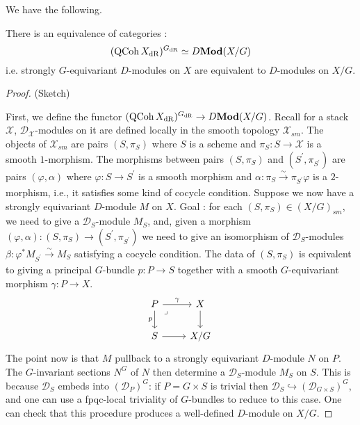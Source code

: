 \documentclass{article}
\begin{document}
We have the following.
\begin{prop}
  
  There is an equivalence of categories : 
  \[
    (\operatorname{QCoh} X_{\mathrm{dR}})^{G_{\mathrm{dR}}} \simeq D\mathbf{Mod}(X / G)
  \]
  i.e. strongly $G$-equivariant $D$-modules on $X$
  are equivalent to $D$-modules on $X / G$.
\end{prop}
\begin{proof}(Sketch)
  
  First, we define the functor $(\operatorname{QCoh} X_{\mathrm{dR}})^{G_{\mathrm{dR}}} \to D\mathbf{Mod}(X / G)$.
  Recall for a stack $\mathscr{X}$, 
  $\mathcal{D}_{\mathscr{X}}$-modules on it are defined locally 
  in the smooth topology $\mathscr{X}_{sm}$.
  The objects of $\mathscr{X}_{sm}$ are pairs $(S,\pi_S)$ 
  where $S$ is a scheme and 
  $\pi_S : S \to \mathscr{X}$ is a smooth $1$-morphism. 
  \cite[Section 1.1.2]{BD}
  The morphisms between pairs $(S,\pi_S)$ and 
  $(S^\prime, \pi_{S^\prime})$ are pairs $(\varphi,\alpha)$ 
  where $\varphi: S \to S^\prime$ is a smooth morphism 
  and $\alpha: \pi_S \xrightarrow[]{\sim} \pi_{S^\prime} \varphi$ is 
  a $2$-morphism, i.e., it satisfies some kind of cocycle condition. 
  Suppose we now have a strongly equivariant $D$-module $M$ on $X$.
  Goal : for each $(S,\pi_S) \in (X / G)_{sm}$, 
  we need to give a $\mathcal{D}_S$-module $M_S$, 
  and, given a morphism 
  $(\varphi, \alpha):(S,\pi_S) \to (S^\prime,\pi_{S^\prime})$ 
  we need to give an isomorphism of 
  $\mathcal{D}_{S}$-modules 
  $\beta: \varphi^* M_{S^\prime} \xrightarrow[]{\sim} M_{S}$ 
  satisfying a cocycle condition. 
  The data of $(S , \pi_S)$ is equivalent to 
  giving a principal $G$-bundle $p:P \to S$ together with 
  a smooth $G$-equivariant morphism $\gamma: P \to X$. 
  \begin{equation}
  \begin{tikzcd}
    P & X \\
    S & {X/G}
    \arrow["\gamma", from=1-1, to=1-2]
    \arrow["p"', from=1-1, to=2-1]
    \arrow[from=2-1, to=2-2]
    \arrow[from=1-2, to=2-2]
    \arrow["\lrcorner"{anchor=center, pos=0.125}, draw=none, from=1-1, to=2-2]
  \end{tikzcd}
  \end{equation}
  The point now is that $M$ pullback to a strongly equivariant 
  $D$-module $N$ on $P$.
  The $G$-invariant sections $N^G$ of $N$ then 
  determine a $\mathcal{D}_S$-module $M_S$ on $S$. 
  This is because $\mathcal{D}_S$ embeds into $(\mathcal{D}_P)^G$: 
  if $P = G \times S$ is trivial then 
  $\mathcal{D}_S \hookrightarrow (\mathcal{D}_{G \times S})^G$, 
  and one can use a fpqc-local triviality of $G$-bundles 
  to reduce to this case. 
  One can check that this procedure produces 
  a well-defined $D$-module on $X / G$.


\end{proof}
\end{document}
